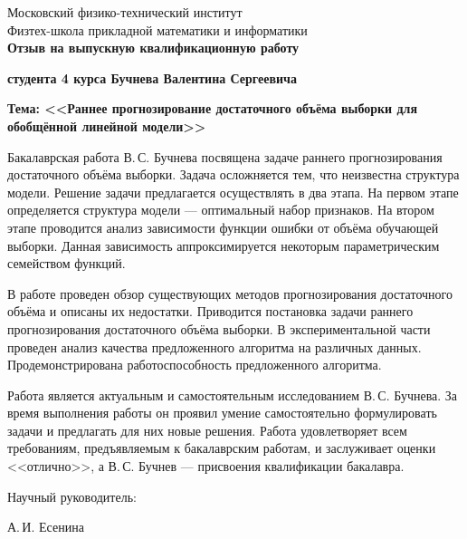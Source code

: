 \documentclass[12pt]{article}
\begin{document}
\begin{center}
    \sc
        Московский физико-технический институт\\
        Физтех-школа прикладной математики и информатики\\
    \bf\Large
		Отзыв на выпускную квалификационную работу
\end{center}

\textbf{студента 4 курса Бучнева Валентина Сергеевича}

\textbf{Тема: <<Раннее прогнозирование достаточного объёма выборки для обобщённой линейной модели>>}

Бакалаврская работа В.\,С. Бучнева посвящена задаче раннего прогнозирования достаточного объёма выборки. Задача осложняется тем, что неизвестна структура модели. Решение задачи предлагается осуществлять в два этапа. На первом этапе определяется структура модели --- оптимальный набор признаков. На втором этапе проводится анализ зависимости функции ошибки от объёма обучающей выборки. Данная зависимость аппроксимируется некоторым параметрическим семейством функций.

В работе проведен обзор существующих методов прогнозирования достаточного объёма и описаны их недостатки. Приводится постановка задачи раннего прогнозирования достаточного объёма выборки. В экспериментальной части проведен анализ качества предложенного алгоритма на различных данных. Продемонстрирована работоспособность предложенного алгоритма.

Работа является актуальным и самостоятельным исследованием В.\,С. Бучнева. За время выполнения работы он проявил умение самостоятельно формулировать задачи и предлагать для них новые решения. Работа удовлетворяет всем требованиям, предъявляемым к бакалаврским работам, и заслуживает оценки <<отлично>>, а В.\,С. Бучнев --- присвоения квалификации бакалавра.


\vspace{1.5cm}
Научный руководитель:

А.\,И. Есенина
\end{document}
